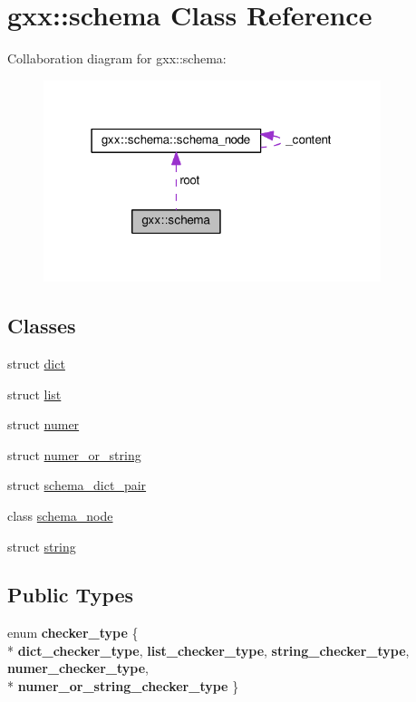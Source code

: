 \hypertarget{classgxx_1_1schema}{}\section{gxx\+:\+:schema Class Reference}
\label{classgxx_1_1schema}


Collaboration diagram for gxx\+:\+:schema\+:
\nopagebreak
\begin{figure}[H]
\begin{center}
\leavevmode
\includegraphics[width=279pt]{classgxx_1_1schema__coll__graph}
\end{center}
\end{figure}
\subsection*{Classes}
\begin{DoxyCompactItemize}
\item 
struct \hyperlink{structgxx_1_1schema_1_1dict}{dict}
\item 
struct \hyperlink{structgxx_1_1schema_1_1list}{list}
\item 
struct \hyperlink{structgxx_1_1schema_1_1numer}{numer}
\item 
struct \hyperlink{structgxx_1_1schema_1_1numer__or__string}{numer\+\_\+or\+\_\+string}
\item 
struct \hyperlink{structgxx_1_1schema_1_1schema__dict__pair}{schema\+\_\+dict\+\_\+pair}
\item 
class \hyperlink{classgxx_1_1schema_1_1schema__node}{schema\+\_\+node}
\item 
struct \hyperlink{structgxx_1_1schema_1_1string}{string}
\end{DoxyCompactItemize}
\subsection*{Public Types}
\begin{DoxyCompactItemize}
\item 
enum {\bfseries checker\+\_\+type} \{ \\*
{\bfseries dict\+\_\+checker\+\_\+type}, 
{\bfseries list\+\_\+checker\+\_\+type}, 
{\bfseries string\+\_\+checker\+\_\+type}, 
{\bfseries numer\+\_\+checker\+\_\+type}, 
\\*
{\bfseries numer\+\_\+or\+\_\+string\+\_\+checker\+\_\+type}
 \}\hypertarget{classgxx_1_1schema_af437bf3704a7c922389df3023baddaab}{}\label{classgxx_1_1schema_af437bf3704a7c922389df3023baddaab}

\end{DoxyCompactItemize}
